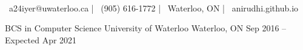 \documentclass[]{awesome-cv}
\begin{document}
    
\begin{center}
	  \\
	\vspace{2mm}
	{\faEnvelope\ a24iyer@uwaterloo.ca} | {\faMobile\ (905) 616-1772} | {\faMapMarker\ Waterloo, ON} | {\faLink\ anirudhi.github.io}
\end{center}
\begin{cventries}
	\cventry
	{BCS in Computer Science}
	{University of Waterloo}
	{Waterloo, ON}
	{Sep 2016 – Expected Apr 2021}
	{}
\end{cventries}
\end{document}
